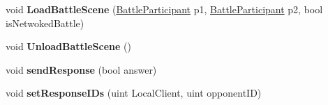 \begin{DoxyCompactItemize}
\item 
\hypertarget{class_game_manager_a9d3b6a3fb49a9402e1afde9224a12e21}{void {\bfseries Load\-Battle\-Scene} (\hyperlink{class_battle_participant}{Battle\-Participant} p1, \hyperlink{class_battle_participant}{Battle\-Participant} p2, bool is\-Netwoked\-Battle)}\label{class_game_manager_a9d3b6a3fb49a9402e1afde9224a12e21}

\item 
\hypertarget{class_game_manager_a4b49768a7f34b0f3795741f997eca643}{void {\bfseries Unload\-Battle\-Scene} ()}\label{class_game_manager_a4b49768a7f34b0f3795741f997eca643}

\item 
\hypertarget{class_game_manager_a716b6f017d2c90b2e53163a64e0838b7}{void {\bfseries send\-Response} (bool answer)}\label{class_game_manager_a716b6f017d2c90b2e53163a64e0838b7}

\item 
\hypertarget{class_game_manager_ae47f87854a1314f74035195257b84233}{void {\bfseries set\-Response\-I\-Ds} (uint Local\-Client, uint opponent\-I\-D)}\label{class_game_manager_ae47f87854a1314f74035195257b84233}

\end{DoxyCompactItemize}
